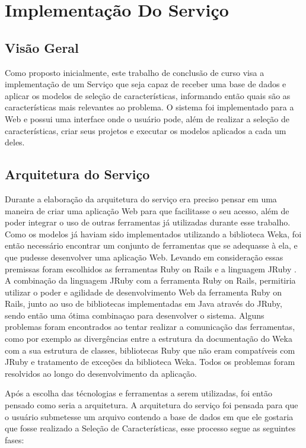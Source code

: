 \chapter[Implementação do Serviço]{Implementação Do Serviço}
\label{ch:servico}
\section{Visão Geral}

Como proposto inicialmente, este trabalho de conclusão de curso visa a implementação de um Serviço que seja capaz de receber uma base de dados e aplicar os modelos de seleção de características, informando então quais são as características mais relevantes ao problema. O sistema foi implementado para a Web e possui uma interface onde o usuário pode, além de realizar a seleção de características, criar seus projetos e executar os modelos aplicados a cada um deles.

\section{Arquitetura do Serviço}

Durante a elaboração da arquitetura do serviço era preciso pensar em uma maneira de criar uma aplicação Web para que facilitasse o seu acesso, além de poder integrar o uso de outras ferramentas já utilizadas durante esse trabalho. Como os modelos já haviam sido implementados utilizando a biblioteca Weka, foi então necessário encontrar um conjunto de ferramentas que se adequasse à ela, e que pudesse desenvolver uma aplicação Web. Levando em consideração essas premissas foram escolhidos as ferramentas Ruby on Rails \cite{ror} e a linguagem JRuby \cite{jruby}. A combinação da linguagem JRuby com a ferramenta Ruby on Rails, permitiria utilizar o poder e agilidade de desenvolvimento Web da ferramenta Ruby on Rails, junto ao uso de bibliotecas implementadas em Java através do JRuby, sendo então uma ótima combinaçao para desenvolver o sistema. Alguns problemas foram encontrados ao tentar realizar a comunicação das ferramentas, como por exemplo as divergências entre a estrutura da documentação do Weka com a sua estrutura de classes, bibliotecas Ruby que não eram compatíveis com JRuby e tratamento de exceções da biblioteca Weka. Todos os problemas foram resolvidos ao longo do desenvolvimento da aplicação.

Após a escolha das técnologias e ferramentas a serem utilizadas, foi então pensado como seria a arquitetura. A arquitetura do serviço foi pensada para que o usuário submetesse um arquivo contendo a base de dados em que ele gostaria que fosse realizado a Seleção de Características, esse processo segue as seguintes fases:

